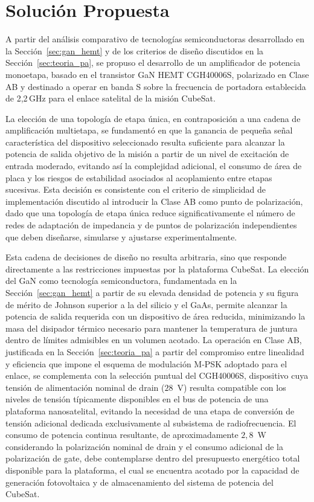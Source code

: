\chapter[Solución propuesta]{Solución Propuesta} \label{sec:solucion_propuesta}
A partir del análisis comparativo de tecnologías semiconductoras desarrollado en la Sección~\ref{sec:gan_hemt} y de los criterios de diseño discutidos en la Sección~\ref{sec:teoria_pa}, se propuso el desarrollo de un amplificador de potencia monoetapa, basado en el transistor GaN HEMT CGH40006S, polarizado en Clase AB y destinado a operar en banda S sobre la frecuencia de portadora establecida de 2,2\,GHz para el enlace satelital de la misión CubeSat.

La elección de una topología de etapa única, en contraposición a una cadena de amplificación multietapa, se fundamentó en que la ganancia de pequeña señal característica del dispositivo seleccionado resulta suficiente para alcanzar la potencia de salida objetivo de la misión a partir de un nivel de excitación de entrada moderado, evitando así la complejidad adicional, el consumo de área de placa y los riesgos de estabilidad asociados al acoplamiento entre etapas sucesivas. Esta decisión es consistente con el criterio de simplicidad de implementación discutido al introducir la Clase AB como punto de polarización, dado que una topología de etapa única reduce significativamente el número de redes de adaptación de impedancia y de puntos de polarización independientes que deben diseñarse, simularse y ajustarse experimentalmente.

Esta cadena de decisiones de diseño no resulta arbitraria, sino que responde directamente a las restricciones impuestas por la plataforma CubeSat. La elección del GaN como tecnología semiconductora, fundamentada en la Sección~\ref{sec:gan_hemt} a partir de su elevada densidad de potencia y su figura de mérito de Johnson superior a la del silicio y el GaAs, permite alcanzar la potencia de salida requerida con un dispositivo de área reducida, minimizando la masa del disipador térmico necesario para mantener la temperatura de juntura dentro de límites admisibles en un volumen acotado. La operación en Clase AB, justificada en la Sección~\ref{sec:teoria_pa} a partir del compromiso entre linealidad y eficiencia que impone el esquema de modulación M-PSK adoptado para el enlace, se complementa con la selección puntual del CGH40006S, dispositivo cuya tensión de alimentación nominal de drain ($28$~V) resulta compatible con los niveles de tensión típicamente disponibles en el bus de potencia de una plataforma nanosatelital, evitando la necesidad de una etapa de conversión de tensión adicional dedicada exclusivamente al subsistema de radiofrecuencia. El consumo de potencia continua resultante, de aproximadamente $2{,}8$~W considerando la polarización nominal de drain y el consumo adicional de la polarización de gate, debe contemplarse dentro del presupuesto energético total disponible para la plataforma, el cual se encuentra acotado por la capacidad de generación fotovoltaica y de almacenamiento del sistema de potencia del CubeSat.

